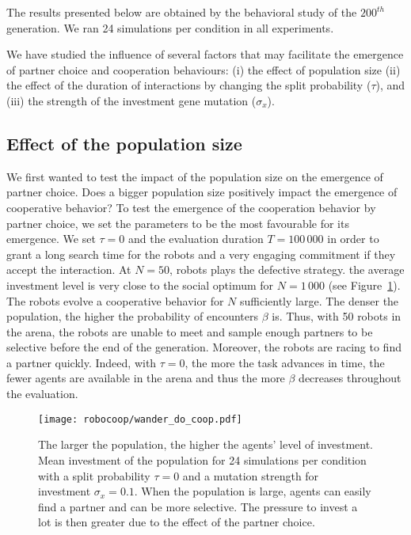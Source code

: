 The results presented below are obtained by the behavioral study of the $200^{th}$ generation.  We ran 24 simulations per condition in all experiments.

We have studied the influence of several factors that may facilitate the emergence of partner choice and cooperation behaviours: (i) the effect of population size (ii) the effect of the duration of interactions by changing the split probability ($\tau$), and (iii) the strength of the investment gene mutation ($\sigma_x$). 

\subsection{Effect of the population size}

We first wanted to test the impact of the population size on the emergence of partner choice. Does a bigger population size positively impact the emergence of cooperative behavior? %
To test the emergence of the cooperation behavior by partner choice, we set the parameters to be the most favourable for its emergence. We set $\tau = 0$ and the evaluation duration $T = 100\,000$ in order to grant a long search time for the robots and a very engaging commitment if they accept the interaction. %
At $N = 50$, robots plays the defective strategy. the average investment level is very close to the social optimum for $N = 1\,000$ (see Figure~\ref{fig:do_coop}). %
The robots evolve a cooperative behavior for $N$ sufficiently large. The denser the population, the higher the probability of encounters $\beta$ is. Thus, with 50 robots in the arena, the robots are unable to meet and sample enough partners to be selective before the end of the generation. Moreover, the robots are racing to find a partner quickly. Indeed, with $\tau = 0$, the more the task advances in time, the fewer agents are available in the arena and thus the more $\beta$ decreases throughout the evaluation. %



\begin{figure}[tbhp]
    \begin{center}
        \texttt{[image: robocoop/wander\_do\_coop.pdf]}
        \vskip 0.25cm
        \caption{The larger the population, the higher the agents' level of investment.
        Mean investment of the population for 24 simulations per condition with a split probability $\tau = 0$ and a mutation strength for investment $\sigma_x = 0.1$. When the population is large, agents can easily find a partner and can be more selective. The pressure to invest a lot is then greater due to the effect of the partner choice.
        }
        \label{fig:do_coop}
    \end{center}
\end{figure}


